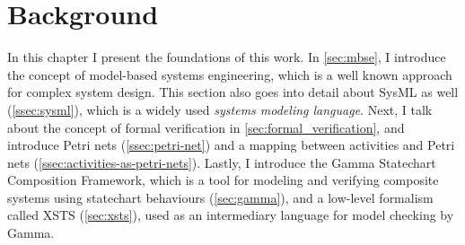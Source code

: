 \chapter{Background}\label{ch:background}

In this chapter I present the foundations of this work. In \autoref{sec:mbse}, I introduce the concept of model-based systems engineering, which is a well known approach for complex system design. This section also goes into detail about SysML as well (\autoref{ssec:sysml}), which is a widely used \emph{systems modeling language}. Next, I talk about the concept of formal verification in \autoref{sec:formal_verification}, and introduce Petri nets (\autoref{ssec:petri-net}) and a mapping between activities and Petri nets (\autoref{ssec:activities-as-petri-nets}). Lastly, I introduce the Gamma Statechart Composition Framework, which is a tool for modeling and verifying composite systems using statechart behaviours (\autoref{sec:gamma}), and a low-level formalism called XSTS (\autoref{sec:xsts}), used as an intermediary language for model checking by Gamma.


%




